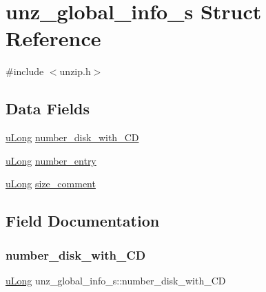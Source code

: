 \hypertarget{structunz__global__info__s}{}\section{unz\+\_\+global\+\_\+info\+\_\+s Struct Reference}
\label{structunz__global__info__s}


{\ttfamily \#include $<$unzip.\+h$>$}

\subsection*{Data Fields}
\begin{DoxyCompactItemize}
\item 
\hyperlink{ioapi_8h_a50e9e9d5c30e481de822ad68fe537986}{u\+Long} \hyperlink{structunz__global__info__s_a8a5b5440026871b6973b0c495b5e5e0c}{number\+\_\+disk\+\_\+with\+\_\+\+CD}
\item 
\hyperlink{ioapi_8h_a50e9e9d5c30e481de822ad68fe537986}{u\+Long} \hyperlink{structunz__global__info__s_a827d1cd1d09f12acd6c2ee12494cb320}{number\+\_\+entry}
\item 
\hyperlink{ioapi_8h_a50e9e9d5c30e481de822ad68fe537986}{u\+Long} \hyperlink{structunz__global__info__s_a10b58ab57b62301de813ecac0e974363}{size\+\_\+comment}
\end{DoxyCompactItemize}


\subsection{Field Documentation}
\mbox{\label{structunz__global__info__s_a8a5b5440026871b6973b0c495b5e5e0c}} 
\subsubsection{\texorpdfstring{number\+\_\+disk\+\_\+with\+\_\+\+CD}{number\_disk\_with\_CD}}
{\footnotesize\ttfamily \hyperlink{ioapi_8h_a50e9e9d5c30e481de822ad68fe537986}{u\+Long} unz\+\_\+global\+\_\+info\+\_\+s\+::number\+\_\+disk\+\_\+with\+\_\+\+CD}

\mbox{\label{structunz__global__info__s_a827d1cd1d09f12acd6c2ee12494cb320}} 
